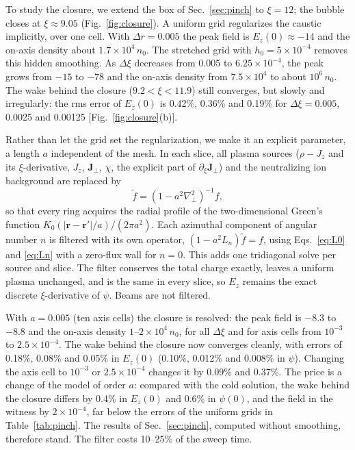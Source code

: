 \documentclass[aps,prab,reprint,floatfix,superscriptaddress,amsmath,amssymb]{revtex4-2}
\begin{document}
To study the closure, we extend the box of Sec.~\ref{sec:pinch} to $\xi = 12$; the bubble closes at $\xi \approx 9.05$ (Fig.~\ref{fig:closure}). A uniform grid regularizes the caustic implicitly, over one cell. With $\Delta r = 0.005$ the peak field is $E_z(0) \approx -14$ and the on-axis density about $1.7\times10^4\,n_0$. The stretched grid with $h_0 = 5\times10^{-4}$ removes this hidden smoothing. As $\Delta\xi$ decreases from 0.005 to $6.25\times10^{-4}$, the peak grows from $-15$ to $-78$ and the on-axis density from $7.5\times10^4$ to about $10^6\,n_0$. The wake behind the closure ($9.2 < \xi < 11.9$) still converges, but slowly and irregularly: the rms error of $E_z(0)$ is 0.42\%, 0.36\% and 0.19\% for $\Delta\xi = 0.005$, 0.0025 and 0.00125 [Fig.~\ref{fig:closure}(b)].

Rather than let the grid set the regularization, we make it an explicit parameter, a length $a$ independent of the mesh. In each slice, all plasma sources ($\rho - J_z$ and its $\xi$-derivative, $J_z$, $\bm{J}_\perp$, $\chi$, the explicit part of $\partial_\xi\bm{J}_\perp$) and the neutralizing ion background are replaced by
\begin{equation}
\tilde f = \left(1 - a^2\nabla_\perp^2\right)^{-1} f , \label{eq:smooth}
\end{equation}
so that every ring acquires the radial profile of the two-dimensional Green's function $K_0(|\bm{r}-\bm{r}'|/a)/(2\pi a^2)$. Each azimuthal component of angular number $n$ is filtered with its own operator, $(1 - a^2 L_n)\tilde f = f$, using Eqs.~\eqref{eq:L0} and \eqref{eq:Ln} with a zero-flux wall for $n=0$. This adds one tridiagonal solve per source and slice. The filter conserves the total charge exactly, leaves a uniform plasma unchanged, and is the same in every slice, so $E_z$ remains the exact discrete $\xi$-derivative of $\psi$. Beams are not filtered.

With $a = 0.005$ (ten axis cells) the closure is resolved: the peak field is $-8.3$ to $-8.8$ and the on-axis density $1$--$2\times10^4\,n_0$, for all $\Delta\xi$ and for axis cells from $10^{-3}$ to $2.5\times10^{-4}$. The wake behind the closure now converges cleanly, with errors of 0.18\%, 0.08\% and 0.05\% in $E_z(0)$ (0.10\%, 0.012\% and 0.008\% in $\psi$). Changing the axis cell to $10^{-3}$ or $2.5\times10^{-4}$ changes it by 0.09\% and 0.37\%. The price is a change of the model of order $a$: compared with the cold solution, the wake behind the closure differs by 0.4\% in $E_z(0)$ and 0.6\% in $\psi(0)$, and the field in the witness by $2\times10^{-4}$, far below the errors of the uniform grids in Table~\ref{tab:pinch}. The results of Sec.~\ref{sec:pinch}, computed without smoothing, therefore stand. The filter costs 10--25\% of the sweep time.
\end{document}
